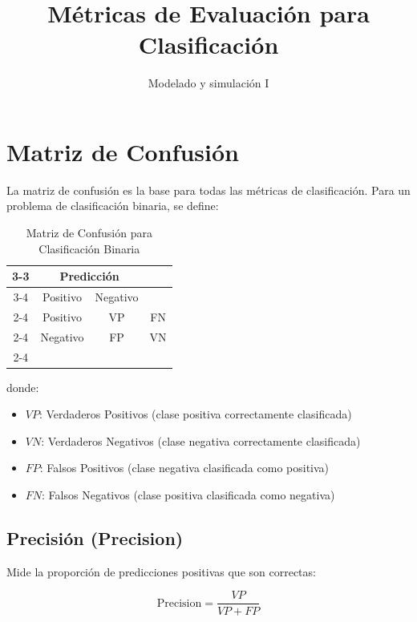 \documentclass[12pt]{article}
\title{Métricas de Evaluación para Clasificación}
\author{Modelado y simulación I}
\date{}
\begin{document}
\maketitle

\section{Matriz de Confusión}

La matriz de confusión es la base para todas las métricas de clasificación. Para un problema de clasificación binaria, se define:

\begin{table}[h]
\centering
\begin{tabular}{c|c|c|c|}
\cline{3-3}
\multicolumn{2}{c|}{} & \multicolumn{2}{c}{Predicción} \\
\cline{3-4}
\multicolumn{2}{c|}{} & Positivo & Negativo \\
\cline{2-4}
\multirow{2}{*}{Real} & Positivo & VP & FN \\
\cline{2-4}
& Negativo & FP & VN \\
\cline{2-4}
\end{tabular}
\caption{Matriz de Confusión para Clasificación Binaria}
\end{table}

donde:
\begin{itemize}
\item $VP$: Verdaderos Positivos (clase positiva correctamente clasificada)
\item $VN$: Verdaderos Negativos (clase negativa correctamente clasificada)
\item $FP$: Falsos Positivos (clase negativa clasificada como positiva)
\item $FN$: Falsos Negativos (clase positiva clasificada como negativa)
\end{itemize}


\subsection{Precisión (Precision)}

Mide la proporción de predicciones positivas que son correctas:

\begin{equation}
\text{Precision} = \frac{VP}{VP + FP}
\end{equation}
\end{document}
